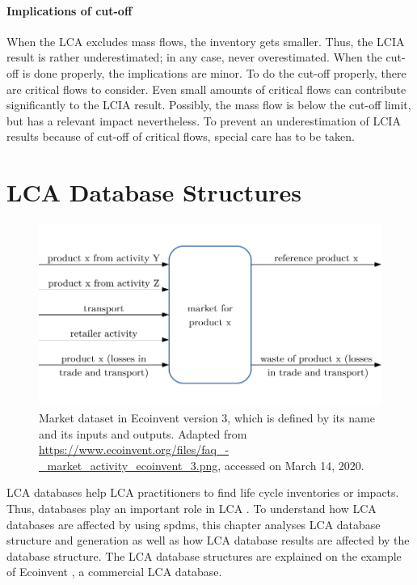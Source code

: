 \paragraph{Implications of cut-off}  When the LCA excludes mass flows, the inventory gets smaller. Thus, the LCIA result is rather underestimated; in any case, never overestimated. When the cut-off is done properly, the implications are minor. To do the cut-off properly, there are critical flows to consider. Even small amounts of critical flows can contribute significantly to the LCIA result. Possibly, the mass flow is below the cut-off limit, but has a relevant impact nevertheless. To prevent an underestimation of LCIA results because of cut-off of critical flows, special care has to be taken.

\section{\acl{LCA} Database Structures}

\begin{figure}[h!]
    \centering
    \includegraphics[]{images/market-dataset.pdf}
    \caption[Market dataset in Ecoinvent]{Market dataset in Ecoinvent version 3, which is defined by its name and its inputs and outputs. Adapted from \url{https://www.ecoinvent.org/files/faq_-_market_activity_ecoinvent_3.png}, accessed on March 14, 2020.}
    \label{fig:market}
\end{figure}
\ac{LCA} databases help LCA practitioners to find life cycle inventories or impacts. Thus, databases play an important role in LCA \cite{Wernet.2016}. To understand how  LCA databases are affected by using \aclp{spdm}, this chapter analyses LCA database structure and  generation as well as how LCA database results are affected by the database structure. The LCA database structures are explained on the example of Ecoinvent \cite{Ecoinvent.2020}, a commercial LCA database.

